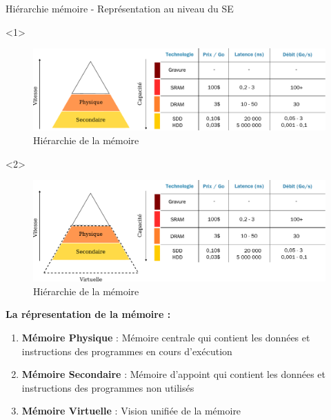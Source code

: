 \documentclass[8pt]{beamer}
\begin{document}
\begin{frame}{Hiérarchie mémoire - Représentation au niveau du SE}
    \begin{onlyenv}<1>
        \begin{figure}
            \centering

            \includegraphics[width=\linewidth]{figures/hierarchy_memory_virtual.pdf}
            \caption{Hiérarchie de la mémoire \cite{harris2021digital}}
        \end{figure}
    \end{onlyenv}
    \begin{onlyenv}<2>
        \begin{figure}
            \centering

            \includegraphics[width=\linewidth]{figures/hierarchy_memory_virtual_physic.pdf}
            \caption{Hiérarchie de la mémoire \cite{harris2021digital}}
        \end{figure}
    \end{onlyenv}

    \textbf{La répresentation de la mémoire :}
    \begin{enumerate}
        \item \textbf{Mémoire Physique} : Mémoire centrale qui contient
              les
              données et instructions des programmes en cours d'exécution
        \item \textbf{Mémoire Secondaire} : Mémoire d'appoint qui
              contient
              les données et instructions des programmes non utilisés
        \item<2> \textbf{Mémoire Virtuelle} : Vision unifiée de la
            mémoire

    \end{enumerate}
\end{frame}
\end{document}
